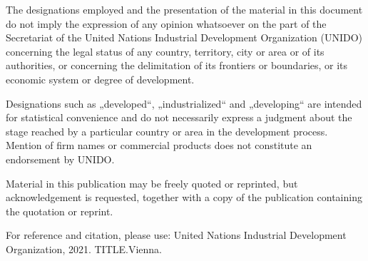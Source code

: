 {{{{\begin{fullwidth}
\noindent The designations employed and the presentation of the material in this document do not imply the expression of any opinion whatsoever on the part of the Secretariat of the United Nations Industrial Development Organization (UNIDO) concerning the legal status of any country, territory, city or area or of its authorities, or concerning the delimitation of its frontiers or boundaries, or its economic system or degree of development.

\noindent Designations such as „developed“, „industrialized“ and „developing“ are intended for statistical convenience and do not necessarily express a judgment about the stage reached by a particular country or area in the development process. Mention of firm names or commercial products does not constitute an endorsement by UNIDO.

\noindent Material in this publication may be freely quoted or reprinted, but acknowledgement is requested, together with a copy of the publication containing the quotation or reprint.

\noindent For reference and citation, please use: United Nations Industrial Development Organization, 2021. TITLE.Vienna.
\end{fullwidth}
}}
}

\thispagestyle{empty}
\clearpage

}
\makeatletter

\renewcommand*\l@figure{\@dottedtocline{1}{1.5em}{2.3em}}
\renewcommand*\l@table{\@dottedtocline{1}{1.5em}{2.3em}}

\let\stdl@figure\l@figure
\renewcommand*{\l@figure}[2]{%
  \stdl@figure{\textcolor{unidosuppl}{#1}}{\textcolor{unidoblue}{#2}}}

\let\stdl@table\l@table
\renewcommand*{\l@table}[2]{%
  \stdl@table{\textcolor{unidosuppl}{#1}}{\textcolor{unidoblue}{#2}}}

\renewcommand*\contentsname{Table of Contents}                  %

\renewcommand*\l@chapter{\@dottedtocline{1}{1.5em}{2.3em}}
\renewcommand*\l@section{\@dottedtocline{1}{1.5em}{2.3em}}
\renewcommand*\l@subsection{\@dottedtocline{2}{3.8em}{2.3em}}
\renewcommand*\l@subsubsection{\@dottedtocline{3}{7.0em}{4.1em}}


\let\stdl@chapter\l@chapter
\renewcommand*{\l@chapter}[2]{%
  \stdl@chapter{\textcolor{unidosuppl}{#1}}{\textcolor{unidoblue}{#2}}}
\let\stdl@section\l@section
\renewcommand*{\l@section}[2]{%
  \stdl@section{\hspace{0.3cm}\textcolor{unidosuppl}{#1}}{\textcolor{unidoblue}{#2}}}
\let\stdl@subsection\l@subsection
\renewcommand*{\l@subsection}[2]{%
  \stdl@subsection{\hspace{0.3cm}\textcolor{unidosuppl}{#1}}{\textcolor{unidoblue}{#2}}}
\renewcommand*{\l@subsubsection}[2]{%
  \stdl@subsection{\hspace{0.3cm}\textcolor{unidosuppl}{#1}}{\textcolor{unidoblue}{#2}}} 

